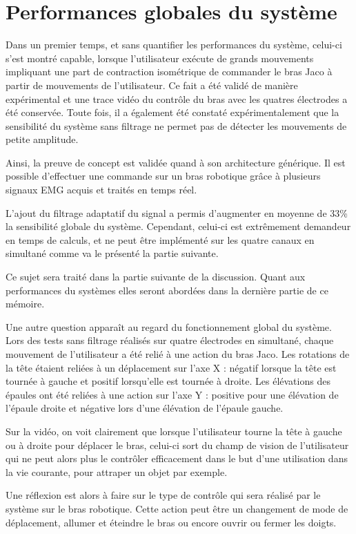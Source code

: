 \documentclass[letterpaper, twoside, 12pt, memoire, creativecommons, hyperref]{thETS}
\begin{document}
\section{Performances globales du système}

Dans un premier temps, et sans quantifier les performances du système, celui-ci s'est montré capable, lorsque l'utilisateur exécute de grands mouvements impliquant une part de contraction isométrique de commander le bras Jaco à partir de mouvements de l'utilisateur. Ce fait a été validé de manière expérimental et une trace vidéo du contrôle du bras avec les quatres électrodes a été conservée. Toute fois, il a également été constaté expérimentalement que la sensibilité du système sans filtrage ne permet pas de détecter les mouvements de petite amplitude. 

Ainsi, la preuve de concept est validée quand à son architecture générique. Il est possible d'effectuer une commande sur un bras robotique grâce à plusieurs signaux EMG acquis et traités en temps réel.

L'ajout du filtrage adaptatif du signal a permis d'augmenter en moyenne de 33\% la sensibilité globale du système. Cependant, celui-ci est extrêmement demandeur en temps de calculs, et ne peut être implémenté sur les quatre canaux en simultané comme va le présenté la partie suivante.

Ce sujet sera traité dans la partie suivante de la discussion. Quant aux performances du systèmes elles seront abordées dans la dernière partie de ce mémoire.

Une autre question apparaît au regard du fonctionnement global du système. Lors des tests sans filtrage réalisés sur quatre électrodes en simultané, chaque mouvement de l'utilisateur a été relié à une action du bras Jaco. Les rotations de la tête étaient reliées à un déplacement sur l'axe X : négatif lorsque la tête est tournée à gauche et positif lorsqu'elle est tournée à droite. Les élévations des épaules ont été reliées à une action sur l'axe Y : positive pour une élévation de l'épaule droite et négative lors d'une élévation de l'épaule gauche. 

Sur la vidéo, on voit clairement que lorsque l'utilisateur tourne la tête à gauche ou à droite pour déplacer le bras, celui-ci sort du champ de vision de l'utilisateur qui ne peut alors plus le contrôler efficacement dans le but d'une utilisation dans la vie courante, pour attraper un objet par exemple. 

Une réflexion est alors à faire sur le type de contrôle qui sera réalisé par le système sur le bras robotique. Cette action peut être un changement de mode de déplacement, allumer et éteindre le bras ou encore ouvrir ou fermer les doigts.
\end{document}
